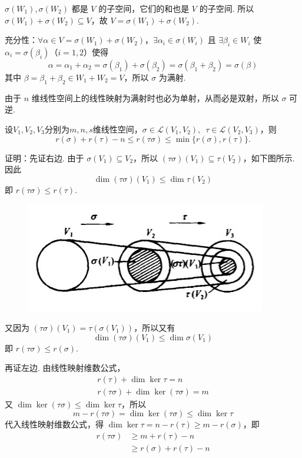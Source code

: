 \begin{exercise}
\begin{exgroup}
\begin{answer}
          $ \sigma(W_1), \sigma(W_2) $ 都是 $ V $ 的子空间，它们的和也是 $ V $ 的子空间. 所以 $ \sigma(W_1) + \sigma(W_2) \subseteq V $，故 $ V = \sigma(W_1) + \sigma(W_2) $.

          充分性：$ \forall \alpha \in V = \sigma(W_1) + \sigma(W_2) $，$ \exists \alpha_i \in \sigma(W_i) $ 且 $ \exists \beta_i \in W_i $ 使 $ \alpha_i = \sigma(\beta_i) $（$ i = 1, 2 $）使得
          \[ \alpha = \alpha_1 + \alpha_2 = \sigma(\beta_1) + \sigma(\beta_2) = \sigma(\beta_1 + \beta_2) = \sigma(\beta) \]
          其中 $ \beta = \beta_1 + \beta_2 \in W_1 + W_2 = V $，所以 $ \sigma $ 为满射.

          由于 $ n $ 维线性空间上的线性映射为满射时也必为单射，从而必是双射，所以 $ \sigma $ 可逆.
        \end{answer}
        \item 设$V_1,V_2,V_3$分别为$m,n,s$维线性空间，$\sigma\in \mathcal{L}(V_1,V_2),\enspace\tau\in \mathcal{L}(V_2,V_3)$，则
        \[r(\sigma)+r(\tau)-n \leqslant r(\tau\sigma) \leqslant \min\{r(\sigma),r(\tau)\}.\]
        \begin{answer}
            证明：先证右边. 由于 $ \sigma(V_1) \subseteq V_2 $，所以 $ (\tau \sigma)(V_1) \subseteq \tau(V_2) $，如下图所示. 因此
          \[ \dim(\tau \sigma)(V_1) \leqslant \dim \tau(V_2) \]
          即 $ r(\tau \sigma) \leqslant r(\tau) $.
          \begin{figure}[H]
              \centering
              \includegraphics[scale=.5]{figs/5C.4.1.jpg}
          \end{figure}
          又因为 $ (\tau \sigma)(V_1) = \tau(\sigma(V_1)) $，所以又有
          \[ \dim(\tau \sigma)(V_1) \leqslant \dim \sigma(V_1) \]
          即 $ r(\tau \sigma) \leqslant r(\sigma) $.

          再证左边. 由线性映射维数公式，
          \begin{gather*}
              r(\tau) + \dim \ker \tau = n \\
              r(\tau \sigma) + \dim \ker(\tau \sigma) = m
          \end{gather*}
          又 $ \dim \ker(\tau \sigma) \leqslant \dim \ker \tau $，所以
          \[ m - r(\tau \sigma) = \dim \ker(\tau \sigma) \leqslant \dim \ker \tau \]
          代入线性映射维数公式，得 $ \dim \ker \tau = n - r(\tau) \geqslant m - r(\sigma) $，即
          \begin{align*}
              r(\tau \sigma) & \geqslant m + r(\tau) - n         \\
                             & \geqslant r(\sigma) + r(\tau) - n
          \end{align*}
        \end{answer}


\end{exgroup}
\end{exercise}
